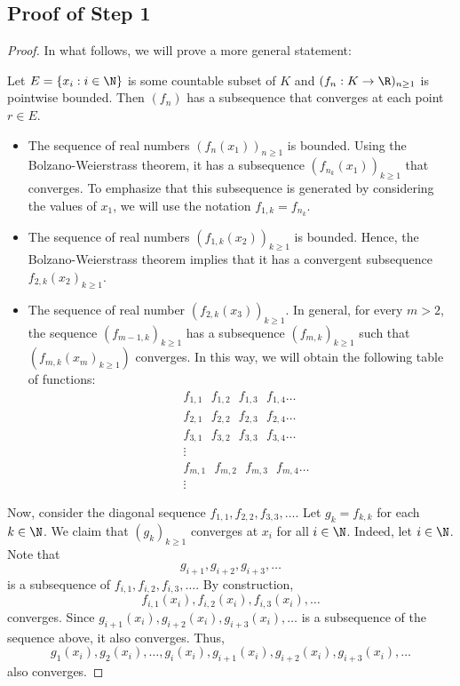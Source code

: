 \subsection*{Proof of Step 1}

\begin{proof}
In what follows, we will prove a more general statement:
\begin{center}
    Let \( E = \{ {x}_{i} : i \in \N  \}  \) is some countable subset of \( K  \) and \( ({f}_{n} : K \to \R )_{n \geq 1} \) is pointwise bounded. Then \( ({f}_{n}) \) has a subsequence that converges at each point \( r \in E  \). 
\end{center}
\begin{itemize}
    \item The sequence of real numbers \( ({f}_{n}({x}_{1}))_{n \geq 1} \) is bounded. Using the Bolzano-Weierstrass theorem, it has a subsequence \( ({f}_{{n}_{k }}({x}_{1}))_{k \geq 1} \) that converges. To emphasize that this subsequence is generated by considering the values of \( {x}_{1} \), we will use the notation \( {f}_{1,k} = {f}_{{n}_{k }} \). 
    \item The sequence of real numbers \( ({f}_{1,k}({x}_{2}))_{k \geq 1} \) is bounded. Hence, the Bolzano-Weierstrass theorem implies that it has a convergent subsequence \( {f}_{2,k}({x}_{2})_{k \geq 1} \). 
    \item The sequence of real number \( ({f}_{2,k}({x}_{3}))_{k \geq 1} \). In general, for every \( m > 2  \), the sequence \( ({f}_{m-1,k})_{k \geq 1} \) has a subsequence \( ({f}_{m,k })_{k \geq 1} \) such that \( ({f}_{m,k}({x}_{m})_{k \geq 1}) \) converges. In this way, we will obtain the following table of functions:
    \begin{align*}
        &{f}_{1,1}  \ \ \  {f}_{1,2} \ \ \   {f}_{1,3} \ \ \   {f}_{1,4} \dots  \\
        &{f}_{2,1} \  \ \   {f}_{2,2} \ \ \   {f}_{2,3} \ \ \  {f}_{2,4} \dots  \\
        &{f}_{3,1} \  \ \  {f}_{3,2} \ \ \   {f}_{3,3} \ \ \   {f}_{3,4} \dots  \\
        &\vdots \\
        &{f}_{m,1} \ \ \   {f}_{m,2} \ \ \   {f}_{m,3} \ \ \   {f}_{m,4} \dots  \\
        &\vdots
    \end{align*}
\end{itemize}
Now, consider the diagonal sequence \( {f}_{1,1} , {f}_{2,2}, {f}_{3,3}, \dots \). Let \( {g}_{k } = {f}_{k,k} \) for each \( k \in \N  \). We claim that \( ({g}_{k })_{k \geq 1} \) converges at \( {x}_{i} \) for all \( i \in \N  \). Indeed, let \( i \in \N  \). Note that 
\[  {g}_{i+1}, {g}_{i+2}, {g}_{i+3}, \dots  \]
is a subsequence of \( {f}_{i,1}, {f}_{i,2}, {f}_{i,3}, \dots \). By construction,  
\[  {f}_{i,1}({x}_{i}), {f}_{i,2}({x}_{i}), {f}_{i,3}({x}_{i}), \dots \]
converges. Since \( {g}_{i+1}({x}_{i}), {g}_{i+2}({x}_{i}), {g}_{i+3}({x}_{i}), \dots  \) is a subsequence of the sequence above, it also converges. Thus,   
\[  {g}_{1}({x}_{i}), {g}_{2}({x}_{i}), \dots, {g}_{i}({x}_{i}) , {g}_{i+1}({x}_{i}) , {g}_{i+2}({x}_{i}), {g}_{i+3}({x}_{i}) , \dots  \]
also converges.
\end{proof}

